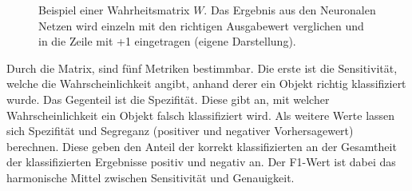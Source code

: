 \begin{figure}[!b]
\begin{center}
\caption[Beispiel einer Warheitsmatrix $W$]{Beispiel einer Wahrheitsmatrix $W$. Das Ergebnis aus den Neuronalen Netzen wird einzeln mit den richtigen Ausgabewert verglichen und in die Zeile mit +1 eingetragen (eigene Darstellung).}\label{cap:conv_matrix}
\end{center}
\end{figure}\label{fig:conv_matrix}

Durch die Matrix, sind fünf Metriken bestimmbar. Die erste ist die Sensitivität, welche die Wahrscheinlichkeit angibt, anhand derer ein Objekt richtig klassifiziert wurde. Das Gegenteil ist die Spezifität. Diese gibt an, mit welcher Wahrscheinlichkeit ein Objekt falsch klassifiziert wird. Als weitere Werte lassen sich Spezifität und Segreganz (positiver und negativer Vorhersagewert) berechnen. Diese geben den Anteil der korrekt klassifizierten an der Gesamtheit der klassifizierten Ergebnisse positiv und negativ an. Der F1-Wert ist dabei das harmonische Mittel zwischen Sensitivität und Genauigkeit.

